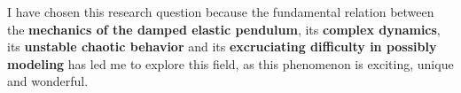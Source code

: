 {I have chosen this research question because the fundamental relation between the \textbf{mechanics of the damped elastic pendulum}, its \textbf{complex dynamics}, its \textbf{unstable chaotic behavior} and its \textbf{excruciating difficulty in possibly modeling} has led me to explore this field, as this phenomenon is exciting, unique and wonderful.}

